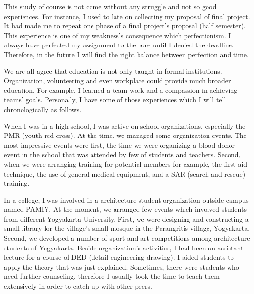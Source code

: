 \documentclass[../main.tex]{subfiles}
\begin{document}
This study of course is not come without any struggle and not so good experiences. For instance, I used to late on collecting my proposal of final project. It had made me to repeat one phase of a final project's proposal (half semester). This experience is one of my weakness's consequence which perfectionism. I always have perfected my assignment to the core until I denied the deadline. Therefore, in the future I will find the right balance between perfection and time.

We are all agree that education is not only taught in formal institutions. Organization, volunteering and even workplace could provide much broader education. For example, I learned a team work and a compassion in achieving teams' goals. Personally, I have some of those experiences which I will tell chronologically as follows.

When I was in a high school, I was active on school organizations, especially the PMR (youth red cross). At the time, we managed some organization events. The most impressive events were first, the time we were organizing a blood donor event in the school that was attended by few of students and teachers. Second, when we were arranging training for potential members for example, the first aid technique, the use of general medical equipment, and a SAR (search and rescue) training.

In a college, I was involved in a architecture student organization outside campus named PAMIY. At the moment, we arranged few events which involved students from different Yogyakarta University. First, we were designing and constructing a small library for the village's small mosque in the Parangritis village, Yogyakarta. Second, we developed a number of sport and art competitions among architecture students of Yogyakarta. Beside organization's activities, I had been an assistant lecture for a course of DED (detail engineering drawing). I aided students to apply the theory that was just explained. Sometimes, there were  students who need further counseling, therefore I usually took the time to teach them extensively in order to catch up with other peers.
\end{document}
